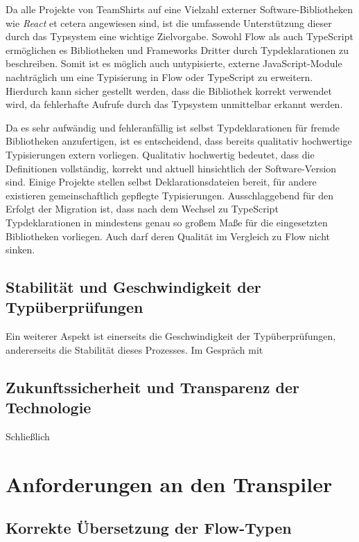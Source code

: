 Da alle Projekte von TeamShirts auf eine Vielzahl externer Software-Bibliotheken wie \textit{React} et cetera angewiesen sind, ist die umfassende Unterstützung dieser durch das Typsystem eine wichtige Zielvorgabe. Sowohl Flow als auch TypeScript ermöglichen es Bibliotheken und Frameworks Dritter durch Typdeklarationen zu beschreiben. Somit ist es möglich auch untypisierte, externe JavaScript-Module nachträglich um eine Typisierung in Flow oder TypeScript zu erweitern. Hierdurch kann sicher gestellt werden, dass die Bibliothek korrekt verwendet wird, da fehlerhafte Aufrufe durch das Typsystem unmittelbar erkannt werden.

Da es sehr aufwändig und fehleranfällig ist selbst Typdeklarationen für fremde Bibliotheken anzufertigen, ist es entscheidend, dass bereits qualitativ hochwertige Typisierungen extern vorliegen. Qualitativ hochwertig bedeutet, dass die Definitionen vollständig, korrekt und aktuell hinsichtlich der Software-Version sind. Einige Projekte stellen selbst Deklarationsdateien bereit, für andere existieren gemeinschaftlich gepflegte Typisierungen. Ausschlaggebend für den Erfolgt der Migration ist, dass nach dem Wechsel zu TypeScript Typdeklarationen in mindestens genau so großem Maße für die eingesetzten Bibliotheken vorliegen. Auch darf deren Qualität im Vergleich zu Flow nicht sinken.

\subsection{Stabilität und Geschwindigkeit der Typüberprüfungen}

Ein weiterer Aspekt ist einerseits die Geschwindigkeit der Typüberprüfungen, andererseits die Stabilität dieses Prozesses. Im Gespräch mit

\subsection{Zukunftssicherheit und Transparenz der Technologie}

Schließlich

\section{Anforderungen an den Transpiler}

\subsection{Korrekte Übersetzung der Flow-Typen}
\label{subsection:requirement:correct-translation}

